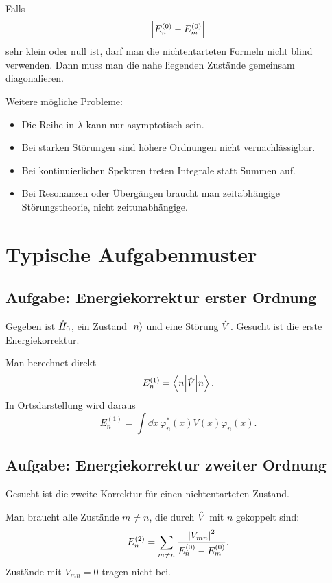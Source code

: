 \begin{notebox}
Falls
\[
    \left| E_n^{(0)}-E_m^{(0)} \right|
\]
sehr klein oder null ist, darf man die nichtentarteten Formeln nicht blind verwenden. Dann muss man die nahe liegenden Zustände gemeinsam diagonalieren.
\end{notebox}

Weitere mögliche Probleme:
\begin{itemize}
    \item Die Reihe in \(\lambda\) kann nur asymptotisch sein.
    \item Bei starken Störungen sind höhere Ordnungen nicht vernachlässigbar.
    \item Bei kontinuierlichen Spektren treten Integrale statt Summen auf.
    \item Bei Resonanzen oder Übergängen braucht man zeitabhängige Störungstheorie, nicht zeitunabhängige.
\end{itemize}

\section{Typische Aufgabenmuster}

\subsection{Aufgabe: Energiekorrektur erster Ordnung}

Gegeben ist \(\hat H_0\), ein Zustand \(\left|n\right\rangle\) und eine Störung \(\hat V\). Gesucht ist die erste Energiekorrektur.

\begin{solutionbox}
Man berechnet direkt
\[
    E_n^{(1)}=\left\langle n\middle|\hat V\middle|n\right\rangle.
\]
In Ortsdarstellung wird daraus
\[
    E_n^{(1)}=\int \dd x\,\varphi_n^*(x)V(x)\varphi_n(x).
\]
\end{solutionbox}

\subsection{Aufgabe: Energiekorrektur zweiter Ordnung}

Gesucht ist die zweite Korrektur für einen nichtentarteten Zustand.

\begin{solutionbox}
Man braucht alle Zustände \(m\neq n\), die durch \(\hat V\) mit \(n\) gekoppelt sind:
\[
    E_n^{(2)}=\sum_{m\neq n}\frac{\left| V_{mn} \right|^2}{E_n^{(0)}-E_m^{(0)}}.
\]
Zustände mit \(V_{mn}=0\) tragen nicht bei.
\end{solutionbox}

